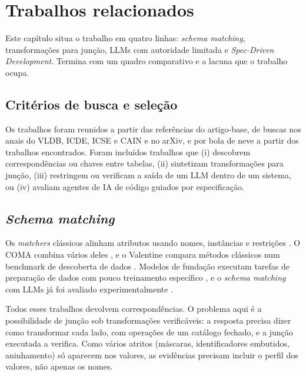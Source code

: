 \chapter{Trabalhos relacionados}
\label{chap:trabalhosrelacionados}

Este capítulo situa o trabalho em quatro linhas: \emph{schema matching},
transformações para junção, LLMs com autoridade limitada e
\emph{Spec-Driven Development}. Termina com um quadro comparativo e a lacuna
que o trabalho ocupa.

\section{Critérios de busca e seleção}
\label{sec:trabalhosrelacionados-criterios-de-busca-e-selecao}

Os trabalhos foram reunidos a partir das referências do artigo-base, de
buscas nos anais do VLDB, ICDE, ICSE e CAIN e no arXiv, e por bola de neve a
partir dos trabalhos encontrados. Foram incluídos trabalhos que (i) descobrem
correspondências ou chaves entre tabelas, (ii) sintetizam transformações
para junção, (iii) restringem ou verificam a saída de um LLM dentro de um
sistema, ou (iv) avaliam agentes de IA de código guiados por especificação.

\section{\emph{Schema matching}}
\label{sec:trabalhosrelacionados-abordagens-de-matching}

Os \emph{matchers} clássicos alinham atributos usando nomes, instâncias e
restrições \cite{rahm2001survey}. O COMA combina vários deles
\cite{do2002coma}, e o Valentine compara métodos clássicos num benchmark de
descoberta de dados \cite{koutras2021valentine}. Modelos de fundação executam
tarefas de preparação de dados com pouco treinamento específico
\cite{narayan2022wrangle}, e o \emph{schema matching} com LLMs já foi avaliado
experimentalmente \cite{parciak2024schema}.

Todos esses trabalhos devolvem correspondências. O problema aqui é a
possibilidade de junção sob transformações verificáveis: a resposta precisa
dizer como transformar cada lado, com operações de um catálogo fechado, e a
junção executada a verifica. Como vários atritos (máscaras, identificadores
embutidos, aninhamento) só aparecem nos valores, as evidências precisam
incluir o perfil dos valores, não apenas os nomes.

